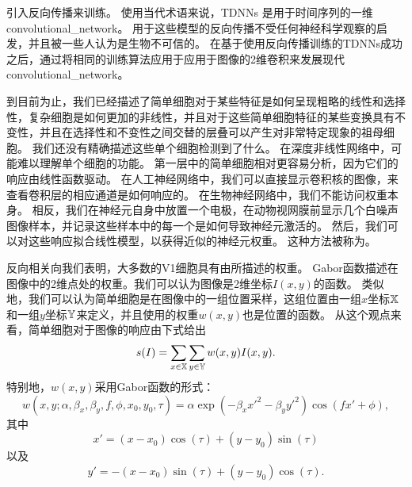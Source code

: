 \cite{Lang+Hinton88}引入反向传播来训练。
使用当代术语来说，TDNNs 是用于时间序列的一维\gls{convolutional_network}。
用于这些模型的反向传播不受任何神经科学观察的启发，并且被一些人认为是生物不可信的。
在基于使用反向传播训练的TDNNs成功之后，\cite{LeCun89d}通过将相同的训练算法应用于应用于图像的2维卷积来发展现代\gls{convolutional_network}。

到目前为止，我们已经描述了简单细胞对于某些特征是如何呈现粗略的线性和选择性，复杂细胞是如何更加的非线性，并且对于这些简单细胞特征的某些变换具有不变性，并且在选择性和不变性之间交替的层叠可以产生对非常特定现象的祖母细胞。
我们还没有精确描述这些单个细胞检测到了什么。
在深度非线性网络中，可能难以理解单个细胞的功能。
第一层中的简单细胞相对更容易分析，因为它们的响应由线性函数驱动。
在人工神经网络中，我们可以直接显示卷积核的图像，来查看卷积层的相应通道是如何响应的。
在生物神经网络中，我们不能访问权重本身。
相反，我们在神经元自身中放置一个电极，在动物视网膜前显示几个白噪声图像样本，并记录这些样本中的每一个是如何导致神经元激活的。
然后，我们可以对这些响应拟合线性模型，以获得近似的神经元权重。
这种方法被称为\citep{ringach2004reverse}。
 
 
反向相关向我们表明，大多数的V1细胞具有由所描述的权重。
Gabor函数描述在图像中的2维点处的权重。我们可以认为图像是2维坐标$I(x,y)$的函数。
类似地，我们可以认为简单细胞是在图像中的一组位置采样，这组位置由一组$x$坐标$\mathbb{X}$和一组$y$坐标$\mathbb{Y}$来定义，并且使用的权重$w(x,y)$也是位置的函数。
从这个观点来看，简单细胞对于图像的响应由下式给出
\begin{equation}
  s(I)=\sum_{x\in \mathbb{X}} \sum_{y\in \mathbb{Y}} w(x, y)I(x,y).
\end{equation}
特别地，$w(x,y)$采用Gabor函数的形式：
\begin{equation}
  w(x, y; \alpha, \beta_x, \beta_y, f, \phi, x_0, y_0, \tau) = \alpha \exp(-\beta_x x'^2 - \beta_y y'^2) \cos (fx' + \phi),
\end{equation}
其中
\begin{equation}
  x' = (x-x_0)\cos(\tau) + (y-y_0)\sin(\tau)
\end{equation}
以及
\begin{equation}
  y' = -(x-x_0) \sin(\tau) + (y-y_0)\cos(\tau).
\end{equation}

